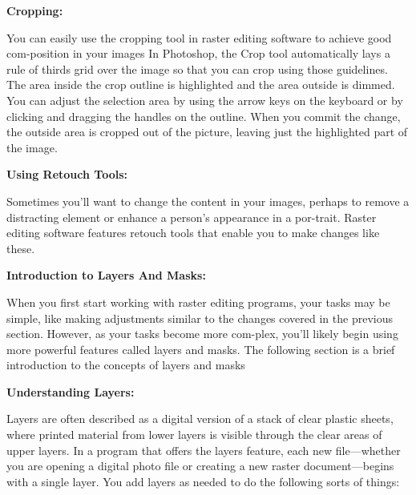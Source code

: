 \documentclass{report}
\begin{document}
    \bigbreak \noindent \bigbreak \noindent 
    \begin{large}
      \textbf{Cropping:}
    \end{large}
    \bigbreak \noindent 
    You can easily use the cropping tool in raster editing software to achieve good com-position in your images
    \bigbreak \noindent 
    In Photoshop, the Crop tool automatically lays a rule of thirds grid over the image so that you can crop using those guidelines. The area inside the crop outline is highlighted and the area outside is dimmed. You can adjust the selection area by using the arrow keys on the keyboard or by clicking and dragging the handles on the outline. When you commit the change, the outside area is cropped out of the picture, leaving just the highlighted part of the image.

    \bigbreak \noindent \bigbreak \noindent 
    \begin{large}
      \textbf{Using Retouch Tools:}
    \end{large}
    \bigbreak \noindent 
    Sometimes you’ll want to change the content in your images, perhaps to remove a distracting element or enhance a person’s appearance in a por-trait. Raster editing software features retouch tools that enable you to make changes like these.
    \bigbreak \noindent 

    \bigbreak \noindent \bigbreak \noindent 
    \begin{Large}
      \textbf{Introduction to Layers And Masks:}
    \end{Large}
    \bigbreak \noindent 
    When you first start working with raster editing programs, your tasks may be simple, like making adjustments similar to the changes covered in the previous section. However, as your tasks become more com-plex, you’ll likely begin using more powerful features called layers and masks. The following section is a brief introduction to the concepts of layers and masks
    
    \bigbreak \noindent \bigbreak \noindent 
    \begin{large}
      \textbf{Understanding Layers:}
    \end{large}
    \bigbreak \noindent 
    Layers are often described as a digital version of a stack of clear plastic sheets, where printed material from lower layers is visible through the clear areas of upper layers. In a program that offers the layers feature, each new file—whether you are opening a digital photo file or creating a new raster document—begins with a single layer. You add layers as needed to do the following sorts of things:
\end{document}
